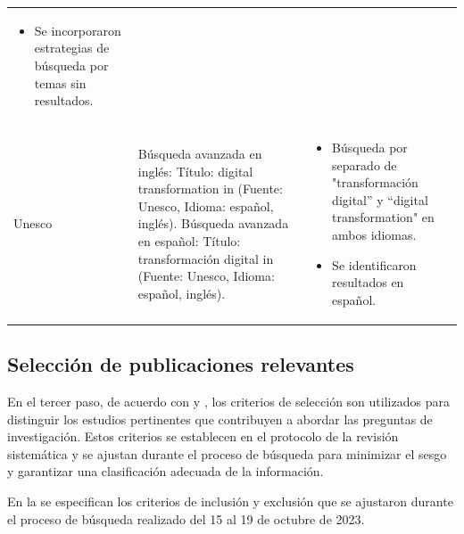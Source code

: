 \begin{table}[htbp]
\begin{tabular}{l >{\raggedright\arraybackslash}p{}>{\raggedright\arraybackslash}p{}}
\begin{itemize}[leftmargin=*, nosep]
            \item Se incorporaron estrategias de búsqueda por temas sin resultados.
        \end{itemize} \\
        Unesco & Búsqueda avanzada en inglés: Título: digital transformation in (Fuente: Unesco, Idioma: español, inglés). 
        Búsqueda avanzada en español: Título: transformación digital in (Fuente: Unesco, Idioma: español, inglés). & \begin{itemize}[leftmargin=*, nosep]
            \item Búsqueda por separado de "transformación digital'' y ``digital transformation" en ambos idiomas.
            \item Se identificaron resultados en español.
        \end{itemize} \\
        \bottomrule
    \end{tabular}
\end{table}

\subsection{Selección de publicaciones relevantes}\label{sub-sec-seleccion-de-publicaciones-relevantes}

En el tercer paso, de acuerdo con \textcite{Kitchenham2007} y \textcite{Petersen2008SystematicMapping,PETERSEN20151}, los criterios de selección son
utilizados para distinguir los estudios pertinentes que contribuyen a
abordar las preguntas de investigación. Estos criterios se establecen en
el protocolo de la revisión sistemática y se ajustan durante el proceso
de búsqueda para minimizar el sesgo y garantizar una clasificación
adecuada de la información.

En la  se especifican los criterios de inclusión y exclusión que
se ajustaron durante el proceso de búsqueda realizado del 15 al 19 de
octubre de 2023.

